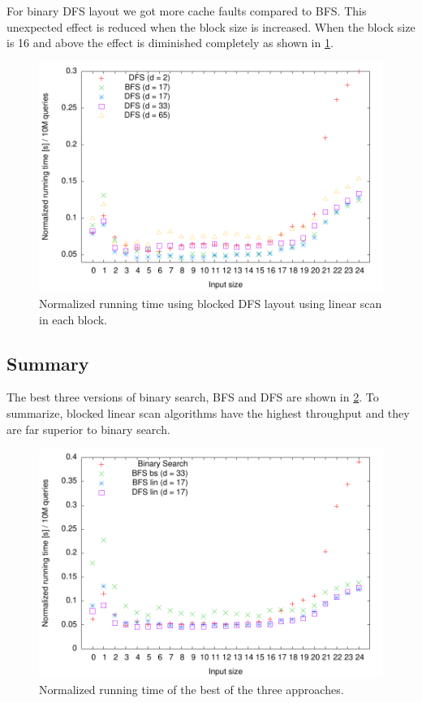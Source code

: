 For binary DFS layout we got more cache faults compared to BFS. This unexpected effect is reduced when the block size is increased. When the block size is 16 and above the effect is diminished completely as shown in \ref{fig:blocked_dfs_lin_runningtime}.

\begin{figure}[h!]
  \centering
  \includegraphics[width=\textwidth]{../week1/plots/outputs/DFS_runningtime}
  \caption{Normalized running time using blocked DFS layout using linear scan in each block.}
  \label{fig:blocked_dfs_lin_runningtime}
\end{figure}

\subsection{Summary}

The best three versions of binary search, BFS and DFS are shown in \ref{fig:champions}. To summarize, blocked linear scan algorithms have the highest throughput and they are far superior to binary search.

\begin{figure}[h!]

  \centering
  \includegraphics[width=\textwidth]{../week1/plots/outputs/bfs_dfs_16_runningtime}
  \caption{Normalized running time of the best of the three approaches.}
  \label{fig:champions}
\end{figure}
